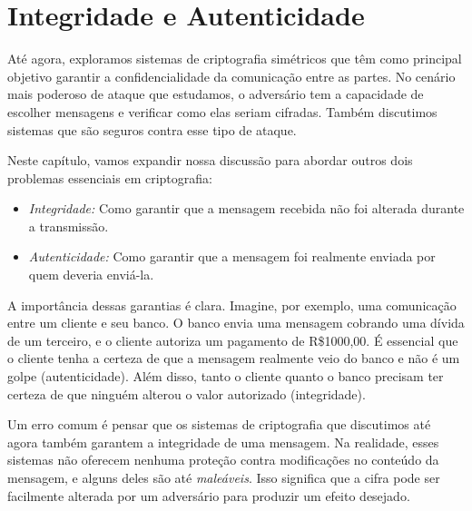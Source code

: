 \chapter{Integridade e Autenticidade}
\label{cha:mac}

Até agora, exploramos sistemas de criptografia simétricos que têm como principal objetivo garantir a confidencialidade da comunicação entre as partes.
No cenário mais poderoso de ataque que estudamos, o adversário tem a capacidade de escolher mensagens e verificar como elas seriam cifradas.
Também discutimos sistemas que são seguros contra esse tipo de ataque.

Neste capítulo, vamos expandir nossa discussão para abordar outros dois problemas essenciais em criptografia:

\begin{itemize}
\item[] {\em Integridade:} Como garantir que a mensagem recebida não foi alterada durante a transmissão.
\item[] {\em Autenticidade:} Como garantir que a mensagem foi realmente enviada por quem deveria enviá-la.
\end{itemize}

A importância dessas garantias é clara.
Imagine, por exemplo, uma comunicação entre um cliente e seu banco.
O banco envia uma mensagem cobrando uma dívida de um terceiro, e o cliente autoriza um pagamento de R\$1000,00.
É essencial que o cliente tenha a certeza de que a mensagem realmente veio do banco e não é um golpe (autenticidade).
Além disso, tanto o cliente quanto o banco precisam ter certeza de que ninguém alterou o valor autorizado (integridade).

Um erro comum é pensar que os sistemas de criptografia que discutimos até agora também garantem a integridade de uma mensagem.
Na realidade, esses sistemas não oferecem nenhuma proteção contra modificações no conteúdo da mensagem, e alguns deles são até {\em maleáveis}.
Isso significa que a cifra pode ser facilmente alterada por um adversário para produzir um efeito desejado.

